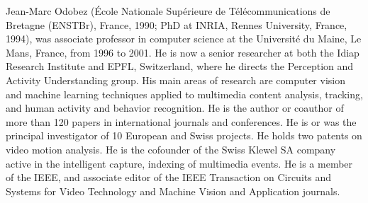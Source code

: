 \begin{IEEEbiography}{Jean-Marc Odobez}
(\'Ecole Nationale Sup\'erieure de T\'el\'ecommunications de Bretagne (ENSTBr), France, 1990;
PhD at INRIA, Rennes University, France, 1994),
was associate professor in computer science at the  Universit\'e du Maine, Le Mans, France, from 1996 to 2001.
He is now a senior researcher at both the Idiap Research Institute and
EPFL, Switzerland, where he directs the Perception and Activity Understanding group.
His main areas of research are computer vision and machine learning
techniques applied to multimedia content analysis, tracking,
and human activity and behavior recognition. He is the author or
coauthor of more than 120 papers in international journals and
conferences. He is or was the principal investigator of 10
European and Swiss projects. He holds two patents on video motion
analysis. He is the cofounder of the Swiss Klewel SA company active in
the intelligent capture, indexing of multimedia events. He is a member of the IEEE, and associate
editor of the IEEE Transaction on Circuits and Systems for Video Technology and Machine Vision and Application journals.
\end{IEEEbiography}





\endinput
